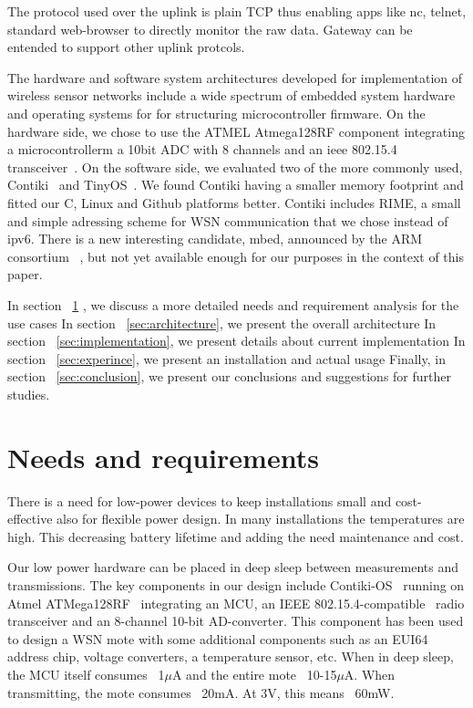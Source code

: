 \documentclass[conference, a4paper,10pt,twocolumn]{IEEEtran}
\begin{document}
The protocol used over the uplink is plain TCP thus enabling apps like 
nc, telnet, standard web-browser to directly monitor the raw data.
Gateway can be entended to support other uplink protcols.

The hardware and software system architectures developed for 
implementation of wireless sensor networks include a wide spectrum of 
embedded system hardware and operating systems for for structuring 
microcontroller firmware.
On the hardware side, we chose to use the ATMEL Atmega128RF component 
integrating a microcontrollerm a 10bit ADC with 8 channels and an ieee 
802.15.4 transceiver~\cite{ATMEGA}.
On the software side, we evaluated two of the more commonly used, 
Contiki~\cite{CONTIKI} and TinyOS~\cite{tinyos}. We found Contiki having 
a smaller memory footprint and fitted our C, Linux and Github platforms 
better. Contiki includes RIME, a small and simple adressing scheme for 
WSN communication that we chose instead of ipv6. There is a new 
interesting candidate, mbed, announced by the ARM consortium 
~\cite{mbed}, but not yet available enough for our purposes in the 
context of this paper.


In section ~\ref{sec:needs} , we discuss a more detailed needs and requirement analysis for the use cases
In section ~\ref{sec:architecture}, we present the overall architecture
In section ~\ref{sec:implementation}, we present details about current implementation  
In section ~\ref{sec:experince}, we present an installation and actual usage
Finally, in section ~\ref{sec:conclusion}, we present our conclusions and suggestions for further studies.
\section{Needs and requirements}
\label{sec:needs}


There is a need for low-power devices to keep installations small and cost-effective also for 
flexible power design. In many installations the temperatures are high. This decreasing 
battery lifetime and adding the need maintenance and cost.

Our low power hardware can be placed in deep sleep between measurements and transmissions.  The key 
components in our design include  Contiki-OS~\cite{CONTIKI} running on Atmel ATMega128RF~\cite{ATMEGA} 
integrating an MCU, an IEEE 802.15.4-compatible~\cite{802154} radio transceiver and an 8-channel 10-bit 
AD-converter. This component has been used to design a WSN mote with some additional components such 
as an EUI64 address chip, voltage converters, a temperature sensor, etc. When in deep sleep, the MCU 
itself consumes ~1$\mu$A and the entire mote ~10-15$\mu$A. When transmitting, the mote consumes 
~20mA. At 3V, this means ~60mW. 
\end{document}

